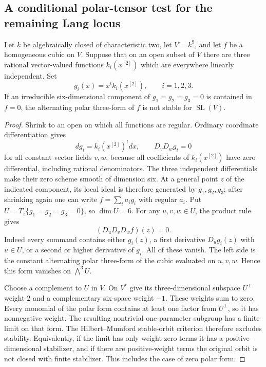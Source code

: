 \subsection{A conditional polar-tensor test for the remaining Lang locus}

\begin{lemma}
\label{lem:polar-third-derivative-Lang-candidate}
Let $k$ be algebraically closed of characteristic two, let $V=k^9$, and
let $f$ be a homogeneous cubic on $V$. Suppose that on an open subset
of $V$ there are three rational vector-valued functions $k_i(x^{[2]})$
which are everywhere linearly independent. Set
\[
                 g_i(x)=x^t k_i(x^{[2]}),\qquad i=1,2,3.
\]
If an irreducible six-dimensional component of $g_1=g_2=g_3=0$
is contained in $f=0$, the alternating polar three-form of $f$
is not stable for $\operatorname{SL}(V)$.
\end{lemma}
\begin{proof}
Shrink to an open on which all functions are regular. Ordinary
coordinate differentiation gives
\[
 dg_i=k_i(x^{[2]})^t dx,\qquad D_vD_wg_i=0
\]
for all constant vector fields $v,w$, because all coefficients of
$k_i(x^{[2]})$ have zero differential, including rational denominators.
The three independent differentials make their zero scheme smooth
of dimension six. At a general point $z$ of the indicated component,
its local ideal is therefore generated by $g_1,g_2,g_3$; after shrinking
again one can write $f=\sum_i a_i g_i$ with regular $a_i$.
Put $U=T_z\{g_1=g_2=g_3=0\}$, so $\dim U=6$.
For any $u,v,w\in U$, the product rule gives
\[
                    (D_uD_vD_w f)(z)=0.
\]
Indeed every summand contains either $g_i(z)$, a first derivative
$D_u g_i(z)$ with $u\in U$, or a second or higher derivative of $g_i$.
All of these vanish. The left side is the constant alternating
polar three-form of the cubic evaluated on $u,v,w$. Hence this form
vanishes on $\bigwedge^3 U$.

Choose a complement to $U$ in $V$. On $V^*$ give its three-dimensional
subspace $U^\perp$ weight $2$ and a complementary six-space weight $-1$.
These weights sum to zero. Every monomial of the polar form contains
at least one factor from $U^\perp$, so it has nonnegative weight.
The resulting nontrivial one-parameter subgroup has a finite limit
on that form. The Hilbert--Mumford stable-orbit criterion therefore
excludes stability. Equivalently, if the limit has only weight-zero
terms it has a positive-dimensional stabilizer, and if there are
positive-weight terms the original orbit is not closed with finite
stabilizer. This includes the case of zero polar form.
\end{proof}

